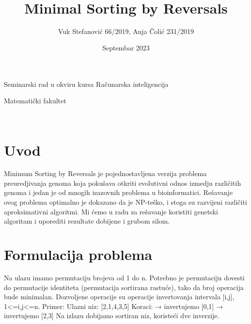 \documentclass{article}
\title{Minimal Sorting by Reversals}
\author{
Vuk Stefanović 66/2019, Anja Čolić 231/2019}
\date{Septembar 2023}
\newcommand{\fakultet}{Matematički fakultet}
\newcommand{\kurs}{Seminarski rad u okviru kursa Računarska inteligencija}
\begin{document}

\maketitle


\begin{center}
\kurs
\end{center}
\begin{center}
\fakultet
\end{center}


\newpage
{}
\renewcommand{\contentsname}{Sadržaj}
\tableofcontents
\newpage

\





\maketitle

\section{Uvod}

Minimum Sorting by Reversals je pojednostavljena verzija problema preuredjivanja genoma koja pokušava otkriti evolutivni odnos izmedju različitih genoma i jedan je od mnogih izazovnih problema u bioinformatici. Rešavanje ovog problema optimalno je dokazano da je NP-teško, i stoga su razvijeni različiti aproksimativni algoritmi. Mi ćemo u radu za rešavanje koristiti genetski algoritam i uporediti rezultate dobijene i grubom silom.

\section{Formulacija problema}
Na ulazu imamo permutaciju brojeva od 1 do n. Potrebno je permutaciju dovesti do permutacije identiteta (permutacija sortirana rastuće), tako da broj operacija bude minimalan.
\newline
\newline
Dozvoljene operacije su operacije invertovanja intervala [i,j], 1<=i,j<=n.
\newline
\newline
Primer:
\newline
Ulazni niz: [2,1,4,3,5]
\newline
Koraci:
\newline
[2,1,4,3,5] → invertujemo [0,1]
\newline
[1,2,4,3,5] → invertujemo [2,3]
\newline
[1,2,3,4,5]
\newline
\newline
Na izlazu dobijamo sortiran niz, koristeći dve inverzije.
\end{document}
